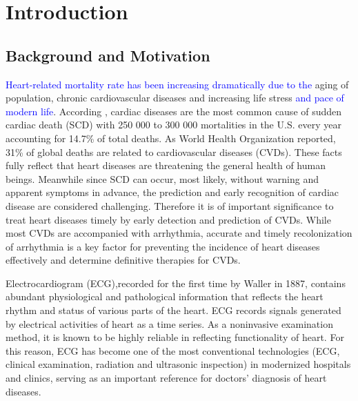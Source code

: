  \chapter{Introduction}

 \section{Background and Motivation}
 
\textcolor{blue}{Heart-related mortality rate has been increasing dramatically due to the} aging of population, chronic cardiovascular diseases and increasing life stress \textcolor{blue}{and pace of modern life}\cite{mortality}. According \cite{SCDnumber}, %
cardiac diseases are the most common cause of sudden cardiac death (SCD) with 250 000 to 300 000 mortalities in the U.S. every year accounting for 14.7\% of total deaths\cite{SCDnumber}. As World Health Organization reported, 31\% of global deaths are related to cardiovascular diseases (CVDs)\cite{who}. %
These facts fully reflect that heart diseases are threatening the general health of human beings. Meanwhile since SCD can occur, most likely, without warning and apparent symptoms in advance, the prediction and early recognition of cardiac disease are considered challenging\cite{circulation2010}. Therefore it is of important significance to treat heart diseases timely by early detection and prediction of CVDs. 
While most CVDs are accompanied with arrhythmia, accurate and timely recolonization of arrhythmia is a key factor for preventing the incidence of heart diseases effectively and determine definitive therapies for CVDs.

Electrocardiogram (ECG),recorded for the first time by Waller in 1887, contains abundant physiological and pathological information that reflects the heart rhythm and status of various parts of the heart\cite{besterman1979waller}. %
 ECG records signals generated by electrical activities of heart as a time series. As a noninvasive examination method, it is known to be highly reliable in reflecting functionality of heart. For this reason, ECG has become one of the most conventional technologies (ECG, clinical examination, radiation and ultrasonic inspection) in modernized hospitals and clinics, serving as an important reference for doctors’ diagnosis of heart diseases.


